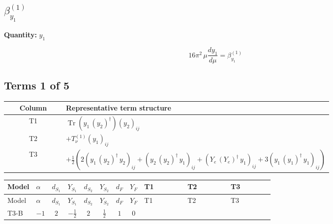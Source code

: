 \documentclass[8pt]{article}
\begin{document}
\begin{landscape}
\section*{$\beta_{y_1}^{(1)}$}
\noindent\textbf{Quantity: }$y_1$\par\smallskip
\[16\pi^2\,\mu\frac{d y_1}{d\mu}=\beta_{y_1}^{(1)}\]
\subsection*{Terms 1 of 5}
\begin{center}
\begin{tabular}{@{}c >{\raggedright\arraybackslash}p{0.82\linewidth}@{}}
\toprule
Column & Representative term structure \\
\midrule
T1 & \(\displaystyle \operatorname{Tr}\!\left({y_1}\,\left({y_2}\right)^{\dagger}\right) \left({y_2}\right)_{ij}\) \\
\midrule
T2 & \(\displaystyle +T_{\nu}^{(1)} \left({y_1}\right)_{ij}\) \\
\midrule
T3 & \(\displaystyle +\frac{1}{2} (2 \left({y_1}\,\left({y_2}\right)^{\dagger}\,{y_2}\right)_{ij}+\left({y_2}\,\left({y_2}\right)^{\dagger}\,{y_1}\right)_{ij}+\left({Y_e}\,\left({Y_e}\right)^{\dagger}\,{y_1}\right)_{ij}+3 \left({y_1}\,\left({y_1}\right)^{\dagger}\,{y_1}\right)_{ij})\) \\
\midrule
\bottomrule
\end{tabular}
\end{center}
\smallskip
\tiny
\begin{longtable}{@{}llcccccc >{\raggedright\arraybackslash}p{0.21\linewidth} >{\raggedright\arraybackslash}p{0.21\linewidth} >{\raggedright\arraybackslash}p{0.21\linewidth}@{}}
\toprule
Model & $\alpha$ & $d_{S_1}$ & $Y_{S_1}$ & $d_{S_2}$ & $Y_{S_2}$ & $d_F$ & $Y_F$ & T1 & T2 & T3 \\
\midrule
\endfirsthead
\toprule
Model & $\alpha$ & $d_{S_1}$ & $Y_{S_1}$ & $d_{S_2}$ & $Y_{S_2}$ & $d_F$ & $Y_F$ & T1 & T2 & T3 \\
\midrule
\endhead
T3-B & $-1$ & $2$ & $-\frac{1}{2}$ & $2$ & $\frac{1}{2}$ & $1$ & $0$ & \scriptsize\adjustbox{max width=\linewidth}{$\begin{gathered} \operatorname{Tr}\!\left({y_1}\,\left({y_2}\right)^{\dagger}\right) \left({y_2}\right)_{ij}\end{gathered}$} & \scriptsize\adjustbox{max width=\linewidth}{$\begin{gathered} +T_{\nu}^{(1)} \left({y_1}\right)_{ij}\end{gathered}$} & \scriptsize\adjustbox{max width=\linewidth}{$\begin{gathered} +\frac{1}{2} (2 \left({y_1}\,\left({y_2}\right)^{\dagger}\,{y_2}\right)_{ij}+\left({y_2}\,\left({y_2}\right)^{\dagger}\,{y_1}\right)_{ij}+\left({Y_e}\,\left({Y_e}\right)^{\dagger}\,{y_1}\right)_{ij}+3 \left({y_1}\,\left({y_1}\right)^{\dagger}\,{y_1}\right)_{ij})\end{gathered}$} \\

\end{longtable}
\end{landscape}
\end{document}
